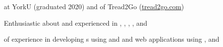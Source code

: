 

\begin{cvparagraph}
        \begin{summaryitems}
            \item \begin{center}  at YorkU (graduated 2020) and  of Tread2Go (\underline{\href{https://www.tread2go.com}{tread2go.com}}) \end{center}
            \item \begin{center} Enthusiastic about and experienced in , , , ,  and  \end{center}
            \item \begin{center}  of experience in developing s using  and  and web applications using ,  and  \end{center}
        \end{summaryitems}
\end{cvparagraph}


